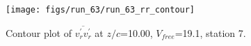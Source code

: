 \begin{figure}[H]
\centering
\texttt{[image: figs/run\_63/run\_63\_rr\_contour]}
\caption{Contour plot of $\overline{v_{r}^{\prime} v_{r}^{\prime}}$ at $z/c$=10.00, $V_{free}$=19.1, station 7.}
\label{fig:run_63_rr_contour}
\end{figure}


